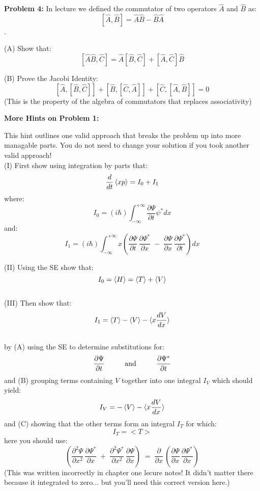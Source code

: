 \documentclass[12pt]{article}
\begin{document}
\vskip 2cm

\noindent
{\bf Problem 4:} In lecture we defined the commutator of two operators $\hat{A}$ and $\hat{B}$ as:
$$[\hat{A}, \hat{B}] = \hat{A}\hat{B} - \hat{B}\hat{A}$$.

\noindent
(A) Show that:
$$ [\hat{A}\hat{B}, \hat{C}] = \hat{A}[\hat{B}, \hat{C}] + [\hat{A}, \hat{C}]\hat{B}$$

\noindent
(B) Prove the Jacobi Identity:
$$ [\hat{A},[\hat{B}, \hat{C}]] + [\hat{B},[\hat{C}, \hat{A}]] + [\hat{C},[\hat{A}, \hat{B}]] = 0$$
(This is the property of the algebra of commutators that replaces associativity)

\newpage

\noindent
{\bf More Hints on Problem 1:}

This hint outlines one valid approach that breaks the problem up into more managable parts.  You do not need to change your solution if you took another valid approach!\\

\noindent
(I) First show using integration by parts that:
$$\frac{d}{dt}\braket{xp} = I_0 + I_1$$
where:
$$I_0 = (i\hbar) \int_{-\infty}^{+\infty} \frac{\partial \Psi}{\partial t} \psi^* dx$$
and:
$$I_1 = (i\hbar) \int_{-\infty}^{+\infty} x
\left(
\frac{\partial \Psi}{\partial t} \, \frac{\partial \Psi^*}{\partial x}
\; - \;
\frac{\partial \Psi}{\partial x} \, \frac{\partial \Psi^*}{\partial t}
\right) dx$$

\noindent
(II) Using the SE show that:
$$I_0 = \braket{H} = \braket{T} + \braket{V}$$ \\

\noindent
(III) Then show that:
$$I_1 = \braket{T} - \braket{V} - \braket{x\frac{dV}{dx}}$$\\
by (A) using the SE to determine substitutions for:
$$\frac{\partial \Psi}{\partial t} \hspace{1cm} {\rm and} \hspace{1cm}
\frac{\partial \Psi^*}{\partial t}$$
and (B) grouping terms containing $V$ together into one integral $I_V$ which should yield:
$$I_V = -\braket{V}-\braket{x\frac{dV}{dx}}$$
and (C) showing that the other terms form an integral $I_T$ for which:
$$I_T = <T>$$
here you should use:
$$
\left(
\frac{\partial^2 \Psi}{\partial x^2} \, \frac{\partial \Psi^*}{\partial x}
\; + \;
\frac{\partial^2 \Psi^*}{\partial x^2} \, \frac{\partial \Psi}{\partial x}
\right)
\; = \; \frac{\partial}{\partial x}\,
\left(
\frac{\partial \Psi}{\partial x} \, \frac{\partial \Psi^*}{\partial x}
\right)
$$
(This was written incorrectly in chapter one lecure notes!  It didn't matter there because it integrated to zero...  but you'll need this correct version here.)
\end{document}

